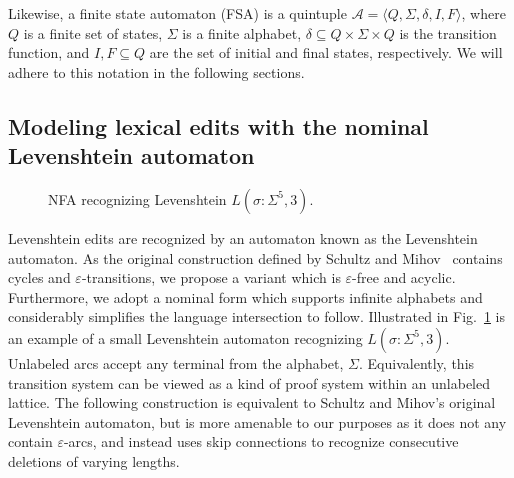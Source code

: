 \documentclass[sigplan,acmsmall,nonacm,screen]{acmart}\settopmatter{printfolios=false,printccs=false,printacmref=false}
\begin{document}
  Likewise, a finite state automaton (FSA) is a quintuple $\mathcal{A} = \langle Q, \Sigma, \delta, I, F\rangle$, where $Q$ is a finite set of states, $\Sigma$ is a finite alphabet, $\delta \subseteq Q \times \Sigma \times Q$ is the transition function, and $I, F \subseteq Q$ are the set of initial and final states, respectively. We will adhere to this notation in the following sections.

  \clearpage\subsection{Modeling lexical edits with the nominal Levenshtein automaton}\label{sec:lev_nfa}

  \begin{figure}
    \vspace{-0.3cm}
    \begin{center}
      
    \end{center}
    \caption{NFA recognizing Levenshtein $L(\sigma: \Sigma^5, 3)$.}\label{fig:lev_nfa}
    \vspace{-0.5cm}
  \end{figure}

  Levenshtein edits are recognized by an automaton known as the Levenshtein automaton. As the original construction defined by Schultz and Mihov~\cite{schulz2002fast} contains cycles and $\varepsilon$-transitions, we propose a variant which is $\varepsilon$-free and acyclic. Furthermore, we adopt a nominal form which supports infinite alphabets and considerably simplifies the language intersection to follow. Illustrated in Fig.~\ref{fig:lev_nfa} is an example of a small Levenshtein automaton recognizing $L(\sigma: \Sigma^5, 3)$. Unlabeled arcs accept any terminal from the alphabet, $\Sigma$. Equivalently, this transition system can be viewed as a kind of proof system within an unlabeled lattice. The following construction is equivalent to Schultz and Mihov's original Levenshtein automaton, but is more amenable to our purposes as it does not any contain $\varepsilon$-arcs, and instead uses skip connections to recognize consecutive deletions of varying lengths.
\end{document}
